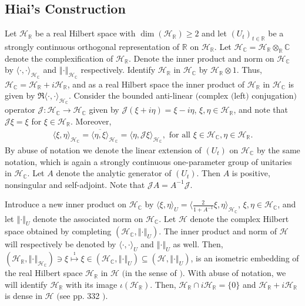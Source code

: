 \documentclass[12pt, a4paper,reqno]{amsart}
\theoremstyle{definition}
\renewcommand{\geq}{\geqslant}
\def\C{\mathbb C}
\def\R{\mathbb R}
\newcommand{\CH}{\mathcal{H}}
\newcommand{\CJ}{\mathcal{J}}
\newcommand{\norm}[1]{\left\Vert#1\right\Vert}
\begin{document}
\subsection{Hiai's Construction}\label{ConsHiai} Let $\CH_{\R}$ be a real Hilbert space with $\dim(\CH_{\R})\geq 2$ and let $(U_t)_{t \in \R}$ be a strongly continuous orthogonal representation of $\R$ on
$\CH_{\R}$.  Let $\CH_\C=\CH_{\R}\otimes_\R \C$ denote the
complexification of $\CH_{\R}$.  Denote the inner product and norm on
$\CH_\C $ by $\langle \cdot , \cdot \rangle_{\CH_\C} $ and
$\norm{\cdot}_{\CH_\C}$ respectively. Identify $\CH_{\R}$ in
$\CH_{\C}$ by $\CH_{\R} \otimes 1 $.  Thus, $\CH_\C = \CH_{\R} + i
\CH_{\R}$, and as a real Hilbert space the inner product of $\CH_{\R}
$ in $\CH_\C $ is given by $\Re \langle \cdot, \cdot \rangle_{\CH_\C}
$.  Consider the bounded anti-linear $($complex $($left$)$ conjugation$)$ operator $\mathcal{J}: \CH_\C
\rightarrow \CH_\C $ given by $\mathcal{J}(\xi + i \eta )= \xi - i
\eta$, $\xi, \eta \in \CH_{\R} $, and note that $\mathcal{J}\xi = \xi$
for $\xi\in \CH_{\R}$. Moreover,
\begin{align*}
\langle \xi, \eta \rangle_{\CH_\C} = \overline {\langle \eta , \xi \rangle}_{\CH_\C}  = \langle \eta , \mathcal{J} \xi \rangle_{\CH_\C}, \text{ for all } \xi \in \CH_{\C} , \eta \in \CH_{\R}.
\end{align*}
By abuse of notation we denote the linear extension of $(U_t)$ on $\CH_{\C}$ by the same notation, which is again a strongly continuous one-parameter group of unitaries in $\CH_{\C}$. Let $A$ denote the analytic generator of $(U_t)$. Then $A$ is positive,  nonsingular and self-adjoint. Note that $\CJ A = A^{-1}\CJ$. 

Introduce a new inner product on $\CH_{\C}$ by $\langle \xi, \eta \rangle_U = \langle \frac{2}{1+ A^{-1}} \xi, \eta \rangle_{\CH_\C}$, $\xi, \eta \in \CH_{\C}$, and let $\norm{\cdot}_{U}$ denote the associated norm on $\CH_{\C}$. Let $\CH$ denote the complex Hilbert space obtained by completing $(\CH_{\C}, \norm{\cdot}_{U})$.  The inner product and norm of $\CH$ will respectively be denoted by $\langle\cdot,\cdot\rangle_U$ and $\norm{\cdot}_{U}$ as well. Then, $(\CH_{\R}, \norm{\cdot}_{\CH_\C})\ni \xi \overset{\imath}\mapsto\xi \in (\CH_{\C}, \norm{\cdot}_{U})\subseteq (\CH,\norm{\cdot}_{U})$, is an isometric embedding of the real Hilbert space $\CH_\R$ in $\CH$ $($in the sense of \cite{Shlyakhtenko}$)$. With abuse of notation, we will identify $\CH_\R$ with its image $\iota(\CH_\R)$. Then, $\CH_{\R}\cap i\CH_{\R}=\{0\}$ and $\CH_{\R}+ i\CH_{\R}$ is dense in $\CH$ $($see pp. 332 \cite{Shlyakhtenko}$)$. 
\end{document}
